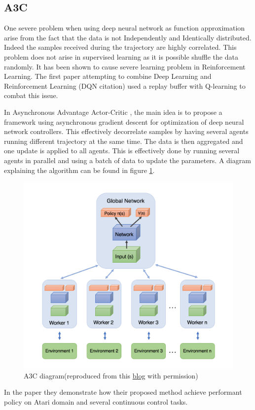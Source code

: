\subsection{A3C}
One severe problem when using deep neural network as function approximation arise from the fact that the data is not Independently and Identically distributed. Indeed the samples received during the trajectory are highly correlated. This problem does not arise in supervised learning as it is possible shuffle the data randomly. It has been shown to cause severe learning problem in Reinforcement Learning. The first paper attempting to combine Deep Learning and Reinforcement Learning (DQN citation) used a replay buffer with Q-learning to combat this issue.

 In Asynchronous Advantage Actor-Critic \citep{mnih2016asynchronous}, the main idea is to propose a framework using asynchronous gradient descent for optimization of deep neural network controllers. This effectively decorrelate samples by having several agents running different trajectory at the same time. The data is then aggregated and one update is applied to all agents. This is effectively done by running several agents in parallel and using a batch of data to update the parameters. A diagram explaining the algorithm can be found in figure \ref{fig:a3c}.
\begin{figure}
    \centering
    \includegraphics[scale=0.25]{fig/A3C.png}
    \caption[Asynchronous Advantage Actor-Critic]{A3C diagram(reproduced from this  \href{https://medium.com/emergent-future/simple-reinforcement-learning-with-tensorflow-part-8-asynchronous-actor-critic-agents-a3c-c88f72a5e9f2}{blog} with permission)}
    \label{fig:a3c}
\end{figure}
In the paper they demonstrate how their proposed method achieve performant policy on Atari domain and several continuous control tasks.
